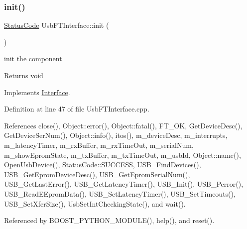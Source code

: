 \subsubsection{\texorpdfstring{init()}{init()}}
{\footnotesize\ttfamily \hyperlink{classStatusCode}{Status\+Code} Usb\+F\+T\+Interface\+::init (\begin{DoxyParamCaption}{ }\end{DoxyParamCaption})\hspace{0.3cm}{\ttfamily [virtual]}}

init the component

\begin{DoxyReturn}{Returns}
void 
\end{DoxyReturn}


Implements \hyperlink{classInterface_a1d095c113b1e89d1f5f68323856fee63}{Interface}.



Definition at line 47 of file Usb\+F\+T\+Interface.\+cpp.



References close(), Object\+::error(), Object\+::fatal(), F\+T\+\_\+\+OK, Get\+Device\+Desc(), Get\+Device\+Ser\+Num(), Object\+::info(), itos(), m\+\_\+device\+Desc, m\+\_\+interrupts, m\+\_\+latency\+Timer, m\+\_\+rx\+Buffer, m\+\_\+rx\+Time\+Out, m\+\_\+serial\+Num, m\+\_\+show\+Eprom\+State, m\+\_\+tx\+Buffer, m\+\_\+tx\+Time\+Out, m\+\_\+usb\+Id, Object\+::name(), Open\+Usb\+Device(), Status\+Code\+::\+S\+U\+C\+C\+E\+SS, U\+S\+B\+\_\+\+Find\+Devices(), U\+S\+B\+\_\+\+Get\+Eprom\+Device\+Desc(), U\+S\+B\+\_\+\+Get\+Eprom\+Serial\+Num(), U\+S\+B\+\_\+\+Get\+Last\+Error(), U\+S\+B\+\_\+\+Get\+Latency\+Timer(), U\+S\+B\+\_\+\+Init(), U\+S\+B\+\_\+\+Perror(), U\+S\+B\+\_\+\+Read\+E\+Eprom\+Data(), U\+S\+B\+\_\+\+Set\+Latency\+Timer(), U\+S\+B\+\_\+\+Set\+Timeouts(), U\+S\+B\+\_\+\+Set\+Xfer\+Size(), Usb\+Set\+Int\+Checking\+State(), and wait().



Referenced by B\+O\+O\+S\+T\+\_\+\+P\+Y\+T\+H\+O\+N\+\_\+\+M\+O\+D\+U\+L\+E(), help(), and reset().


